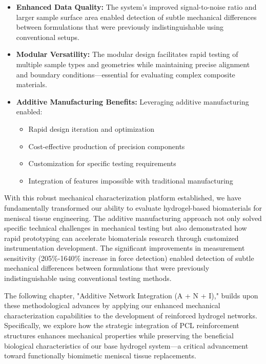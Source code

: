 \begin{itemize}
    \item \textbf{Enhanced Data Quality:} The system's improved signal-to-noise ratio and larger sample surface area enabled detection of subtle mechanical differences between formulations that were previously indistinguishable using conventional setups.
    
    \item \textbf{Modular Versatility:} The modular design facilitates rapid testing of multiple sample types and geometries while maintaining precise alignment and boundary conditions—essential for evaluating complex composite materials.
    
    \item \textbf{Additive Manufacturing Benefits:} Leveraging additive manufacturing enabled:
    \begin{itemize}
        \item Rapid design iteration and optimization
        \item Cost-effective production of precision components
        \item Customization for specific testing requirements
        \item Integration of features impossible with traditional manufacturing
    \end{itemize}
\end{itemize}

With this robust mechanical characterization platform established, we have fundamentally transformed our ability to evaluate hydrogel-based biomaterials for meniscal tissue engineering. The additive manufacturing approach not only solved specific technical challenges in mechanical testing but also demonstrated how rapid prototyping can accelerate biomaterials research through customized instrumentation development. The significant improvements in measurement sensitivity (205\%-1640\% increase in force detection) enabled detection of subtle mechanical differences between formulations that were previously indistinguishable using conventional testing methods.

The following chapter, "Additive Network Integration (A + N + I)," builds upon these methodological advances by applying our enhanced mechanical characterization capabilities to the development of reinforced hydrogel networks. Specifically, we explore how the strategic integration of PCL reinforcement structures enhances mechanical properties while preserving the beneficial biological characteristics of our base hydrogel system—a critical advancement toward functionally biomimetic meniscal tissue replacements.

